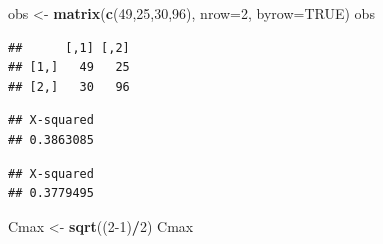 \documentclass[
]{article}
\newenvironment{Shaded}{\begin{snugshade}}{\end{snugshade}}
\newcommand{\AttributeTok}[1]{\textcolor[rgb]{0.13,0.29,0.53}{#1}}
\newcommand{\ConstantTok}[1]{\textcolor[rgb]{0.56,0.35,0.01}{#1}}
\newcommand{\DecValTok}[1]{\textcolor[rgb]{0.00,0.00,0.81}{#1}}
\newcommand{\FunctionTok}[1]{\textcolor[rgb]{0.13,0.29,0.53}{\textbf{#1}}}
\newcommand{\NormalTok}[1]{#1}
\newcommand{\OtherTok}[1]{\textcolor[rgb]{0.56,0.35,0.01}{#1}}
\newcommand{\SpecialCharTok}[1]{\textcolor[rgb]{0.81,0.36,0.00}{\textbf{#1}}}
\begin{document}
\begin{Shaded}
\begin{Highlighting}[]
\NormalTok{obs }\OtherTok{\textless{}{-}} \FunctionTok{matrix}\NormalTok{(}\FunctionTok{c}\NormalTok{(}\DecValTok{49}\NormalTok{,}\DecValTok{25}\NormalTok{,}\DecValTok{30}\NormalTok{,}\DecValTok{96}\NormalTok{), }\AttributeTok{nrow=}\DecValTok{2}\NormalTok{, }\AttributeTok{byrow=}\ConstantTok{TRUE}\NormalTok{)}
\NormalTok{obs}
\end{Highlighting}
\end{Shaded}

\begin{verbatim}
##      [,1] [,2]
## [1,]   49   25
## [2,]   30   96
\end{verbatim}

\begin{Shaded}
\end{Shaded}

\begin{verbatim}
## X-squared 
## 0.3863085
\end{verbatim}

\begin{Shaded}
\end{Shaded}

\begin{verbatim}
## X-squared 
## 0.3779495
\end{verbatim}

\begin{Shaded}
\begin{Highlighting}[]
\NormalTok{Cmax }\OtherTok{\textless{}{-}} \FunctionTok{sqrt}\NormalTok{((}\DecValTok{2{-}1}\NormalTok{)}\SpecialCharTok{/}\DecValTok{2}\NormalTok{)}
\NormalTok{Cmax}
\end{Highlighting}
\end{Shaded}
\end{document}

